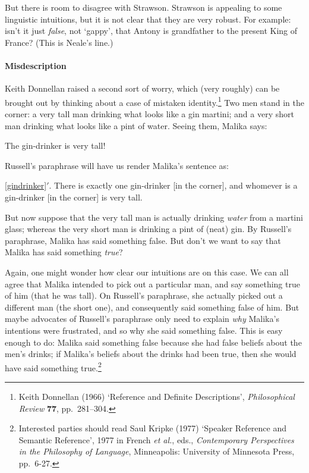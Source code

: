 But there is room to disagree with Strawson. Strawson is appealing to some linguistic intuitions, but it is not clear that they are very robust. For example: isn't it just \emph{false}, not `gappy', that Antony is grandfather to the present King of France? (This is Neale's line.)

\paragraph{Misdescription}
Keith Donnellan raised a second sort of worry, which (very roughly) can be brought out by thinking about a case of mistaken identity.\footnote{Keith Donnellan (1966) `Reference and Definite Descriptions', \emph{Philosophical Review} \textbf{77}, pp.\ 281–304.} Two men stand in the corner: a very tall man drinking what looks like a gin martini; and a very short man drinking what looks like a pint of water. Seeing them, Malika says:
	\begin{earg}
		\item[\ex{gindrinker}] The gin-drinker is very tall!
	\end{earg}
Russell's paraphrase will have us render Malika's sentence as:
	\begin{earg}
		\item[\ref{gindrinker}$'$.] There is exactly one gin-drinker [in the corner], and whomever is a gin-drinker [in the corner] is very tall.
	\end{earg}
But now suppose that the very tall man is actually drinking \emph{water} from a martini glass; whereas the very short man is drinking a pint of (neat) gin. By Russell's paraphrase, Malika has said something false. But don't we want to say that Malika has said something \emph{true}? 

Again, one might wonder how clear our intuitions are on this case. We can all agree that Malika intended to pick out a particular man, and say something true of him (that he was tall). On Russell's paraphrase, she actually picked out a different man (the short one), and consequently said something false of him. But  maybe advocates of Russell's paraphrase only need to explain \emph{why} Malika's intentions were frustrated, and so why she said something false. This is easy enough to do:  Malika said something false because she had false beliefs about the men's drinks; if Malika's beliefs about the drinks had been true,  then she would have said something true.\footnote{Interested parties should read Saul Kripke (1977) `Speaker Reference and Semantic Reference', 1977 in French \emph{et al.}, eds., \emph{Contemporary Perspectives in the Philosophy of Language}, Minneapolis: University of Minnesota Press, pp.\ 6-27.}

